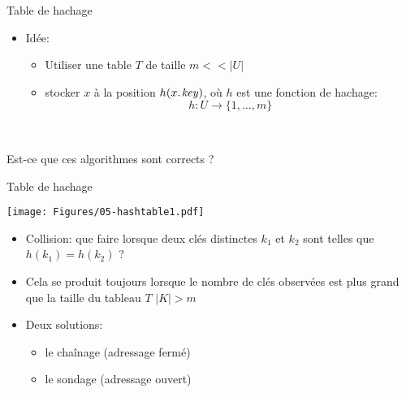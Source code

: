 \begin{frame}{Table de hachage}

\begin{itemize}
\item Idée:
\begin{itemize}
\item Utiliser une table $T$ de taille $m<<|U|$
\item stocker $x$ à la position $h(\attrib{x}{key})$, où $h$ est une fonction de \alert{hachage}: $$h:U\rightarrow \{1,\ldots,m\}$$
\end{itemize}
\end{itemize}

\begin{center}
\begin{small}
~~~~~~~~

\bigskip

\end{small}
\end{center}

Est-ce que ces algorithmes sont corrects ?

\end{frame}

\begin{frame}{Table de hachage}

\centerline{\texttt{[image: Figures/05-hashtable1.pdf]}}

\bigskip

\begin{itemize}
\item \alert{Collision:} que faire lorsque deux clés distinctes $k_1$ et $k_2$ sont telles que $h(k_1)=h(k_2)$ ?
\item Cela se produit toujours lorsque le nombre de clés observées est plus grand que la taille du tableau $T$ $|K|>m$
\item Deux solutions:
\begin{itemize}
\item le chaînage (adressage fermé)
\item le sondage (adressage ouvert)
\end{itemize}
\end{itemize}

\end{frame}

